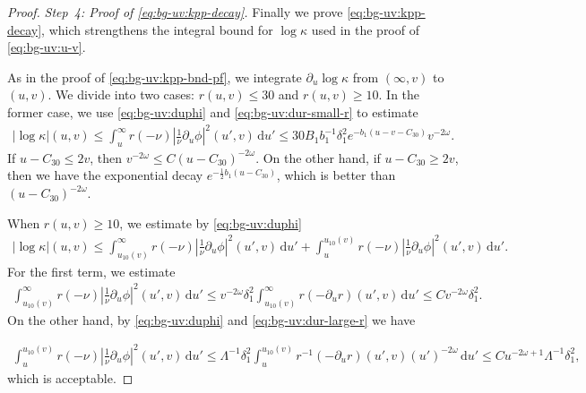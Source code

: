\documentclass[10pt, reqno]{amsart}
\theoremstyle{definition}
\theoremstyle{remark}
\theoremstyle{conjecture}
\numberwithin{equation}{section}
\newcommand{\abs}[1]{\vert#1\vert}
\newcommand{\set}[1]{\{#1\}}
\newcommand{\ud}{\mathrm{d}}
\newcommand{\rd}{\partial}
\newcommand{\0}{\emptyset}
\newcommand{\dlt}{\delta}
\newcommand{\kpp}{\kappa}
\newcommand{\Lmb}{\Lambda}
\newcommand{\omg}{\omega}
\newcommand{\dur}{\nu}
\newcommand{\pfstep}[1]{\vspace{.5em} {\it \noindent #1.}}
\newcommand{\Abs}[1]{\left\vert #1 \right\vert}
\begin{document}
\begin{proof}
\pfstep{Step~4: Proof of \eqref{eq:bg-uv:kpp-decay}}
Finally we prove \eqref{eq:bg-uv:kpp-decay}, which strengthens the integral bound for $\log \kpp$ used in the proof of \eqref{eq:bg-uv:u-v}.

As in the proof of \eqref{eq:bg-uv:kpp-bnd-pf}, we integrate $\rd_{u} \log \kpp$ from $(\infty, v)$ to $(u, v)$. We divide into two cases: $r(u, v) \leq 30$ and $r(u, v) \geq 10$. In the former case, we use \eqref{eq:bg-uv:duphi} and \eqref{eq:bg-uv:dur-small-r} to estimate
\begin{align*}
	\abs{\log \kpp} (u, v) 
	\leq \int_{u}^{\infty} r (-\dur) \Abs{\frac{1}{\dur} \rd_{u} \phi}^{2}(u', v) \, \ud u' 
\leq 30 B_{1} b_{1}^{-1} \dlt_{1}^{2} e^{- b_{1}(u - v - C_{30})} v^{-2 \omg} .
\end{align*}
If $u - C_{30} \leq 2 v$, then $v^{-2 \omg} \leq  C (u - C_{30})^{-2 \omg}$. On the other hand, if $u - C_{30} \geq 2 v$, then we have the exponential decay $e^{-\frac{1}{2} b_{1} (u - C_{30})}$, which is better than $(u - C_{30})^{-2 \omg}$.

When $r(u, v) \geq 10$, we estimate by \eqref{eq:bg-uv:duphi}
\begin{align*}
	\abs{\log \kpp} (u, v) 
\leq \int_{u_{10}(v)}^{\infty} r (-\dur) \Abs{\frac{1}{\dur} \rd_{u} \phi}^{2}(u', v) \, \ud u' 
	+ \int_{u}^{u_{10}(v)} r (-\dur) \Abs{\frac{1}{\dur} \rd_{u} \phi}^{2}(u', v) \, \ud u' .
\end{align*}
For the first term, we estimate
\begin{align*}
\int_{u_{10}(v)}^{\infty} r (-\dur) \Abs{\frac{1}{\dur} \rd_{u} \phi}^{2}(u', v) \, \ud u' 
\leq v^{-2 \omg} \dlt_{1}^{2} \int_{u_{10}(v)}^{\infty} r (- \rd_{u} r) (u', v) \, \ud u'
\leq C v^{-2 \omg} \dlt_{1}^{2}.
\end{align*}
On the other hand, by \eqref{eq:bg-uv:duphi} and \eqref{eq:bg-uv:dur-large-r} we have 

\begin{align*}
\int_{u}^{u_{10}(v)} r (-\dur) \Abs{\frac{1}{\dur} \rd_{u} \phi}^{2}(u', v) \, \ud u' 
\leq \Lmb^{-1} \dlt_{1}^{2} \int_{u}^{u_{10}(v)}  r^{-1} (- \rd_{u} r) (u', v) (u')^{-2 \omg} \, \ud u'
\leq C u^{-2 \omg + 1} \Lmb^{-1} \dlt_{1}^{2},
\end{align*}
which is acceptable. \qedhere
\end{proof}

%
%
%
%
%
\end{document}
